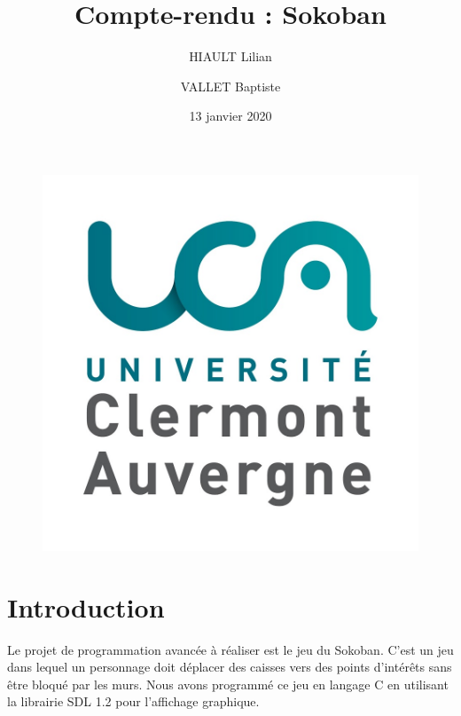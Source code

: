 \documentclass{article}
\title{Compte-rendu : Sokoban}
\author{HIAULT Lilian \and VALLET Baptiste}
\date{13 janvier 2020}
\begin{document}
\begin{figure}[t]
  \centerline{\includegraphics[scale=0.1]{logoUCA.jpg}}
\end{figure}

\maketitle

\tableofcontents

\newpage

\section*{Introduction}

Le projet de programmation avancée à réaliser est le jeu du Sokoban. C'est un jeu dans lequel un personnage doit déplacer des caisses vers des points d'intérêts sans être bloqué par les murs.
Nous avons programmé ce jeu en langage C en utilisant la librairie SDL 1.2 pour l'affichage graphique.
\end{document}
